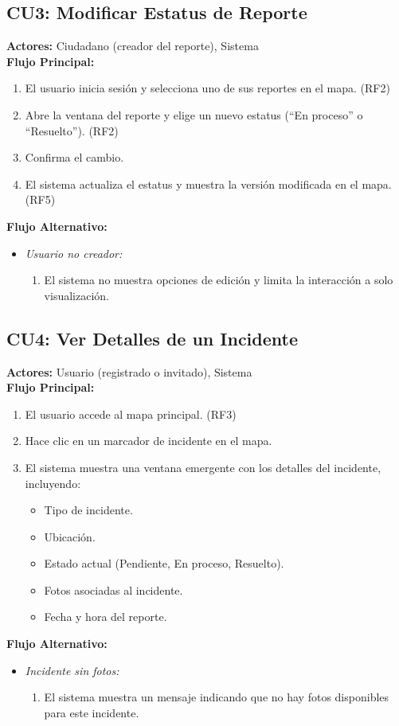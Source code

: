 \subsection*{CU3: Modificar Estatus de Reporte}
\textbf{Actores:} Ciudadano (creador del reporte), Sistema\\
\textbf{Flujo Principal:}
\begin{enumerate}
    \item El usuario inicia sesión y selecciona uno de sus reportes en el mapa. (RF2)
    \item Abre la ventana del reporte y elige un nuevo estatus (``En proceso'' o ``Resuelto''). (RF2)
    \item Confirma el cambio.
    \item El sistema actualiza el estatus y muestra la versión modificada en el mapa. (RF5)
\end{enumerate}
\textbf{Flujo Alternativo:}
\begin{itemize}
    \item \textit{Usuario no creador:}
    \begin{enumerate}
        \item El sistema no muestra opciones de edición y limita la interacción a solo visualización.
    \end{enumerate}
\end{itemize}


\subsection*{CU4: Ver Detalles de un Incidente}
\textbf{Actores:} Usuario (registrado o invitado), Sistema\\
\textbf{Flujo Principal:}
\begin{enumerate}
    \item El usuario accede al mapa principal. (RF3)
    \item Hace clic en un marcador de incidente en el mapa.
    \item El sistema muestra una ventana emergente con los detalles del incidente, incluyendo:
    \begin{itemize}
        \item Tipo de incidente.
        \item Ubicación.
        \item Estado actual (Pendiente, En proceso, Resuelto).
        \item Fotos asociadas al incidente.
        \item Fecha y hora del reporte.
    \end{itemize}
\end{enumerate}
\textbf{Flujo Alternativo:}
\begin{itemize}
    \item \textit{Incidente sin fotos:}
    \begin{enumerate}
        \item El sistema muestra un mensaje indicando que no hay fotos disponibles para este incidente.
    \end{enumerate}
\end{itemize}


